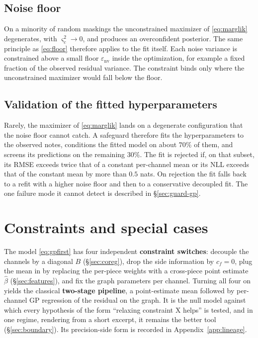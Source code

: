 \documentclass[11pt,a4paper]{report}
\begin{document}
\subsection{Noise floor}
On a minority of random maskings the unconstrained maximizer of
\eqref{eq:marglik} degenerates, with $\varsigma_c^2 \to 0$, and produces an
overconfident posterior. The same principle as \eqref{eq:floor} therefore
applies to the fit itself. Each noise variance is constrained above a small
floor $\varepsilon_{\mathrm{nv}}$ inside the optimization, for example a
fixed fraction of the observed residual variance. The constraint binds only
where the unconstrained maximizer would fall below the floor.

\subsection{Validation of the fitted hyperparameters}
Rarely, the maximizer of \eqref{eq:marglik} lands on a degenerate
configuration that the noise floor cannot catch. A safeguard therefore fits
the hyperparameters to the observed notes, conditions the fitted model on
about $70\%$ of them, and screens its predictions on the remaining $30\%$.
The fit is rejected if, on that subset, its RMSE exceeds twice that of a
constant per-channel mean or its NLL exceeds that of the constant mean by
more than $0.5$ nats. On
rejection the fit falls back to a refit with a higher noise floor and then
to a conservative decoupled fit. The one failure mode it cannot detect is
described in \S\ref{sec:guard-gp}.

\section{Constraints and special cases}\label{sec:special-cases}
The model \eqref{eq:gpfirst} has four independent \textbf{constraint
switches}: decouple the channels by a diagonal $B$ (\S\ref{sec:coreg}), drop
the side information by $c_f = 0$, plug the mean in by replacing the
per-piece weights with a cross-piece point estimate $\hat\beta$
(\S\ref{sec:features}), and fix the graph parameters per channel. Turning
all four on yields the classical \textbf{two-stage pipeline}, a
point-estimate mean followed by per-channel GP regression of the residual
on the graph. It is
the null model against which every hypothesis of the form ``relaxing
constraint X helps'' is tested, and in one regime, rendering from a short
excerpt, it remains the better tool (\S\ref{sec:boundary}). Its
precision-side form is recorded in Appendix~\ref{app:lineage}.
\end{document}
